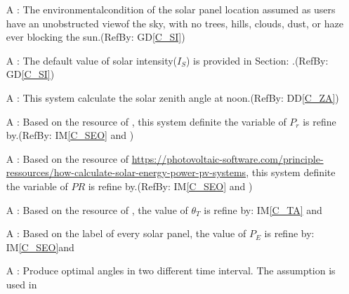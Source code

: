 \documentclass[12pt]{article}
\newcommand{\dref}[1]{GD\ref{#1}}
\newcommand{\ddref}[1]{DD\ref{#1}}
\newcounter{assumpnum} %
\newcommand{\iref}[1]{IM\ref{#1}}
\begin{document}
\begin{itemize}

\item[A\refstepcounter{assumpnum}\theassumpnum \label{a_spe}]: The
environmentalcondition of the solar panel location assumed as users have an
unobstructed viewof the sky, with no trees, hills, clouds, dust, or haze ever
blocking the
sun.(RefBy: \dref{C_SI})\\

\item[A\refstepcounter{assumpnum}\theassumpnum \label{a_dsip}]: The default
value of solar intensity($I_S$) is provided in Section:
.(RefBy: \dref{C_SI})\\

\item[A\refstepcounter{assumpnum}\theassumpnum \label{a_dsia}]: This system
calculate the solar zenith angle at noon.(RefBy: \ddref{C_ZA})\\

\item[A\refstepcounter{assumpnum}\theassumpnum \label{a_dp_r}]: Based
on the resource of \cite{EMPA2011}, this system definite the variable of $P_r$
is refine by.(RefBy: \iref{C_SEO} and )\\

\item[A\refstepcounter{assumpnum}\theassumpnum \label{a_dpr}]: Based
on the resource of
\url{https://photovoltaic-software.com/principle-ressources/how-calculate-solar-energy-power-pv-systems},
this system definite the variable of $PR$ is refine by.(RefBy: \iref{C_SEO} and
)\\

\item[A\refstepcounter{assumpnum}\theassumpnum \label{a_tilta}]: Based
on the resource of \cite{Charles2001}, the value of $\theta_{T}$ is refine by:
\iref{C_TA} and \\


\item[A\refstepcounter{assumpnum}\theassumpnum \label{a_panele}]: Based
on the label of every solar panel, the value of $P_E$ is refine by:
\iref{C_SEO}and \\

\item[A\refstepcounter{assumpnum}\theassumpnum \label{a_timeInterval}]: Produce optimal angles in two different time interval. The assumption is used in  \\



\end{itemize}
\end{document}
